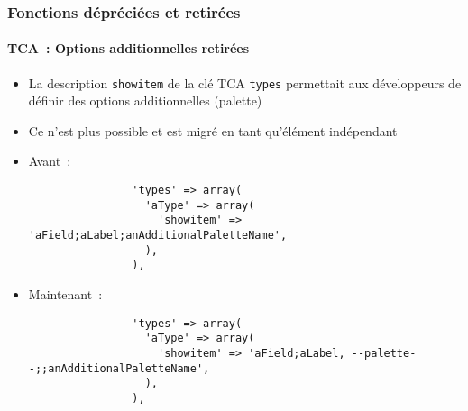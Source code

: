 \begin{frame}[fragile]
	\frametitle{Fonctions dépréciées et retirées}
	\framesubtitle{TCA~: Options additionnelles retirées}

	\lstset{basicstyle=\tiny\ttfamily}

	\begin{itemize}

		\item La description \texttt{showitem} de la clé TCA \texttt{types} permettait aux développeurs
			de définir des options additionnelles (palette)

		\item Ce n'est plus possible et est migré en tant qu'élément indépendant

		\item Avant~:

			\begin{lstlisting}
				'types' => array(
				  'aType' => array(
				    'showitem' => 'aField;aLabel;anAdditionalPaletteName',
				  ),
				),
			\end{lstlisting}

		\item Maintenant~:

			\begin{lstlisting}
				'types' => array(
				  'aType' => array(
				    'showitem' => 'aField;aLabel, --palette--;;anAdditionalPaletteName',
				  ),
				),
			\end{lstlisting}

	\end{itemize}

\end{frame}


